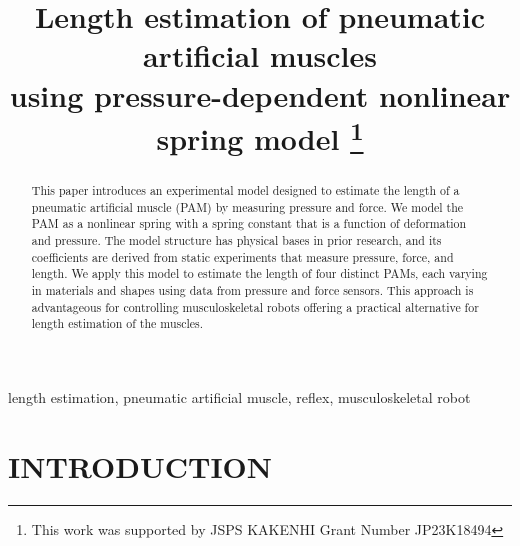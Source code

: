 \documentclass[conference,a4paper,final]{IEEEtran}
\begin{document}
\title{{
Length estimation of pneumatic artificial muscles \\using pressure-dependent nonlinear spring model}
\thanks{This work was supported by JSPS KAKENHI Grant Number JP23K18494}
}


\author{
\and
{}
}

\maketitle


\begin{abstract}
This paper introduces an experimental model designed to estimate the length of a pneumatic artificial muscle (PAM) by measuring pressure and force. We model the PAM as a nonlinear spring with a spring constant that is a function of deformation and pressure. The model structure has physical bases in prior research, and its coefficients are derived from static experiments that measure pressure, force, and length. We apply this model to estimate the length of four distinct PAMs, each varying in materials and shapes using data from pressure and force sensors. This approach is advantageous for controlling musculoskeletal robots offering a practical alternative for length estimation of the muscles.
\end{abstract}


\begin{IEEEkeywords}
length estimation, pneumatic artificial muscle, reflex, musculoskeletal robot
\end{IEEEkeywords}



\section{INTRODUCTION}

\end{document}
